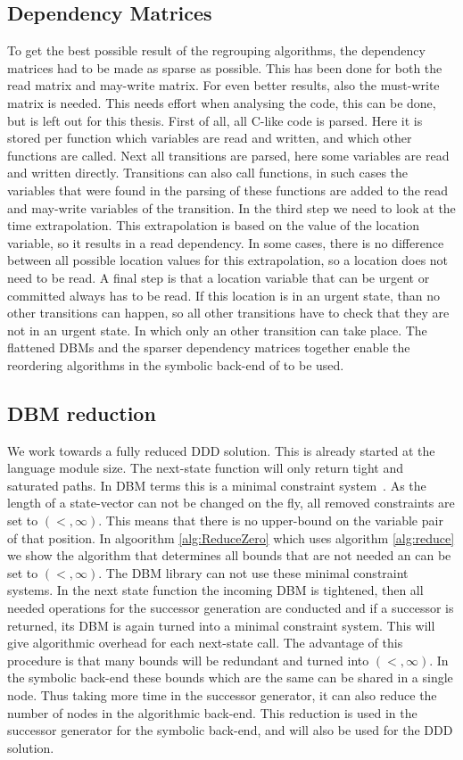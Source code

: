 \subsection{Dependency Matrices}
To get the best possible result of the regrouping algorithms, the dependency matrices had to be made as sparse as possible. This has been done for both the read matrix and may-write matrix. For even better results, also the must-write matrix is needed. This needs effort when analysing the code, this can be done, but is left out for this thesis. First of all, all C-like code is parsed. Here it is stored per function which variables are read and written, and which other functions are called. Next all transitions are parsed, here some variables are read and written directly. Transitions can also call functions, in such cases the variables that were found in the parsing of these functions are added to the read and may-write variables of the transition. In the third step we need to look at the time extrapolation. This extrapolation is based on the value of the location variable, so it results in a read dependency. In some cases, there is no difference between all possible location values for this extrapolation, so a location does not need to be read. A final step is that a location variable that can be urgent or committed always has to be read. If this location is in an urgent state, than no other transitions can happen, so all other transitions have to check that they are not in an urgent state. In which only an other transition can take place.
The flattened DBMs and the sparser dependency matrices together enable the reordering algorithms in the symbolic back-end of \ltsmin{} to be used.

\subsection{DBM reduction}
We work towards a fully reduced DDD solution. This is already started at the language module size. The next-state function will only return tight and saturated paths. In DBM terms this is a minimal constraint system~\cite{bengtsson2002clocks}. As the length of a state-vector can not be changed on the fly, all removed constraints are set to $(<,\infty)$. This means that there is no upper-bound on the variable pair of that position. In algoorithm \ref{alg:ReduceZero} which uses algorithm \ref{alg:reduce} we show the algorithm that determines all bounds that are not needed an can be set to $(<,\infty)$. 
The DBM library can not use these minimal constraint systems. In the next state function the incoming DBM is tightened, then all needed operations for the successor generation are conducted and if a successor is returned, its DBM is again turned into a minimal constraint system. This will give algorithmic overhead for each next-state call. The advantage of this procedure is that many bounds will be redundant and turned into $(<,\infty)$. In the symbolic back-end these bounds which are the same can be shared in a single node. Thus taking more time in the successor generator, it can also reduce the number of nodes in the algorithmic back-end.
This reduction is used in the successor generator for the symbolic back-end, and will also be used for the DDD solution.

